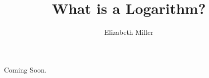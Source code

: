 \documentclass{ximera}
\author{Elizabeth Miller}
\title{What is a Logarithm?}
\begin{document}
\begin{abstract}
  
\end{abstract}
\maketitle

Coming Soon.
\end{document}
